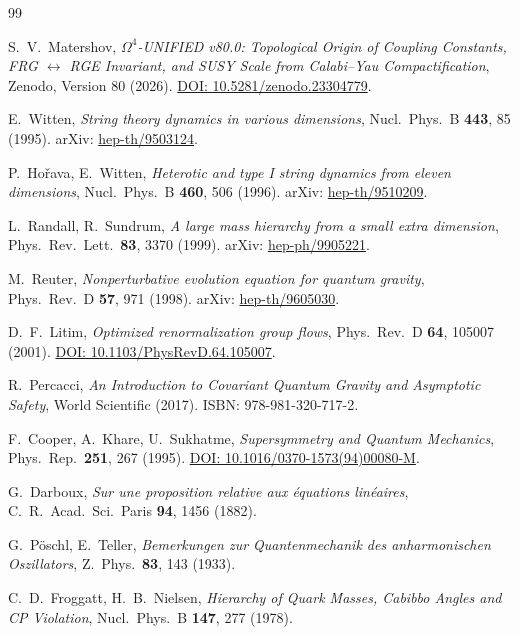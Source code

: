 \documentclass[11pt,a4paper]{article}
\theoremstyle{definition}
\begin{document}
\begin{thebibliography}{99}

S.~V.~Matershov,
\textit{$\Omega^4$-UNIFIED v80.0: Topological Origin of Coupling Constants,
FRG $\leftrightarrow$ RGE Invariant, and SUSY Scale
from Calabi--Yau Compactification},
Zenodo, Version 80 (2026).
\href{https://doi.org/10.5281/zenodo.23304779}{DOI: 10.5281/zenodo.23304779}.

E.~Witten,
\textit{String theory dynamics in various dimensions},
Nucl.\ Phys.\ B \textbf{443}, 85 (1995).
arXiv: \href{https://arxiv.org/abs/hep-th/9503124}{hep-th/9503124}.

P.~Ho\v{r}ava, E.~Witten,
\textit{Heterotic and type I string dynamics from eleven dimensions},
Nucl.\ Phys.\ B \textbf{460}, 506 (1996).
arXiv: \href{https://arxiv.org/abs/hep-th/9510209}{hep-th/9510209}.

L.~Randall, R.~Sundrum,
\textit{A large mass hierarchy from a small extra dimension},
Phys.\ Rev.\ Lett.\ \textbf{83}, 3370 (1999).
arXiv: \href{https://arxiv.org/abs/hep-ph/9905221}{hep-ph/9905221}.

M.~Reuter,
\textit{Nonperturbative evolution equation for quantum gravity},
Phys.\ Rev.\ D \textbf{57}, 971 (1998).
arXiv: \href{https://arxiv.org/abs/hep-th/9605030}{hep-th/9605030}.

D.~F.~Litim,
\textit{Optimized renormalization group flows},
Phys.\ Rev.\ D \textbf{64}, 105007 (2001).
\href{https://doi.org/10.1103/PhysRevD.64.105007}{DOI: 10.1103/PhysRevD.64.105007}.

R.~Percacci,
\textit{An Introduction to Covariant Quantum Gravity and Asymptotic Safety},
World Scientific (2017).
ISBN: 978-981-320-717-2.

F.~Cooper, A.~Khare, U.~Sukhatme,
\textit{Supersymmetry and Quantum Mechanics},
Phys.\ Rep.\ \textbf{251}, 267 (1995).
\href{https://doi.org/10.1016/0370-1573(94)00080-M}{DOI: 10.1016/0370-1573(94)00080-M}.

G.~Darboux,
\textit{Sur une proposition relative aux \'equations lin\'eaires},
C.\ R.\ Acad.\ Sci.\ Paris \textbf{94}, 1456 (1882).

G.~P\"oschl, E.~Teller,
\textit{Bemerkungen zur Quantenmechanik des anharmonischen Oszillators},
Z.\ Phys.\ \textbf{83}, 143 (1933).

C.~D.~Froggatt, H.~B.~Nielsen,
\textit{Hierarchy of Quark Masses, Cabibbo Angles and CP Violation},
Nucl.\ Phys.\ B \textbf{147}, 277 (1978).


\end{thebibliography}
\end{document}
